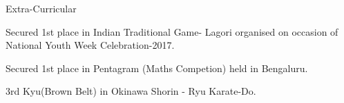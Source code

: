 \documentclass{resume} %
\begin{document}
\begin{rSection}{Extra-Curricular} \itemsep -3pt
\begin{rSubsection}{}{}{}{}
\item Secured 1st place in Indian Traditional Game- Lagori organised on occasion of National Youth Week Celebration-2017.
\item Secured 1st place in Pentagram (Maths Competion) held in Bengaluru.
\item 3rd Kyu(Brown Belt) in Okinawa Shorin - Ryu Karate-Do.
\end{rSubsection}
\end{rSection}
\end{document}
